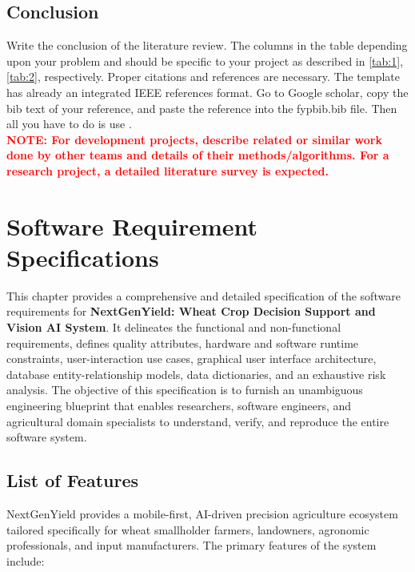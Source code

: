 \documentclass{FastFyp}
\begin{document}
\section{Conclusion}
Write the conclusion of the literature review. 
The columns in the table depending upon your problem and should be specific to your project as described in \ref{tab:1}, \ref{tab:2}, respectively. Proper citations and references are necessary. The template has already an integrated IEEE references format. Go to Google scholar, copy the bib text of your reference, and paste the reference into the fypbib.bib file. Then all you have to do is use \cite{ref:Bishop:2006}.\\ \textcolor{red}{\textbf{NOTE: For development projects, describe related or similar work done by other teams and details of their methods/algorithms. For a research project, a detailed literature survey is expected.}}
 
\chapter{Software Requirement Specifications}
This chapter provides a comprehensive and detailed specification of the software requirements for \textbf{NextGenYield: Wheat Crop Decision Support and Vision AI System}. It delineates the functional and non-functional requirements, defines quality attributes, hardware and software runtime constraints, user-interaction use cases, graphical user interface architecture, database entity-relationship models, data dictionaries, and an exhaustive risk analysis. The objective of this specification is to furnish an unambiguous engineering blueprint that enables researchers, software engineers, and agricultural domain specialists to understand, verify, and reproduce the entire software system.

\section{List of Features}
NextGenYield provides a mobile-first, AI-driven precision agriculture ecosystem tailored specifically for wheat smallholder farmers, landowners, agronomic professionals, and input manufacturers. The primary features of the system include:
\end{document}

